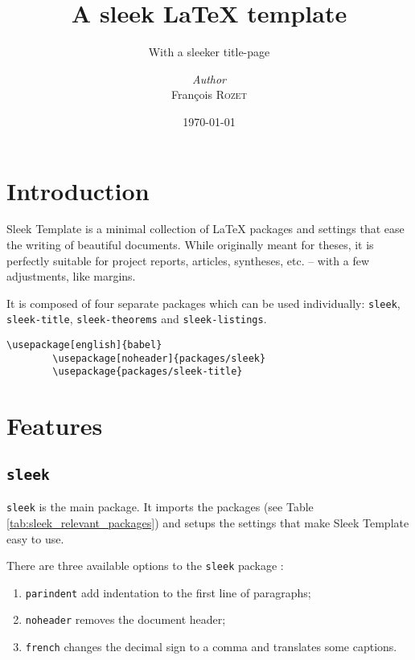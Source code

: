 \documentclass[a4paper, 12pt]{report}
\institute{Random University}
\title{A sleek \LaTeX{} template}
\subtitle{With a sleeker title-page}
\author{\textit{Author}\\François \textsc{Rozet}}
\date{\today}
\begin{document}
    \maketitle
    \romantableofcontents

    \chapter{Introduction}

    Sleek Template is a minimal collection of \LaTeX{} packages and settings that ease the writing of beautiful documents. While originally meant for theses, it is perfectly suitable for project reports, articles, syntheses, etc. -- with a few adjustments, like margins.

    It is composed of four separate packages which can be used individually: \texttt{sleek}, \texttt{sleek-title}, \texttt{sleek-theorems} and \texttt{sleek-listings}.

    \begin{lstlisting}[style=latexFrameTB, caption={Example of Sleek Template packages usage.}, gobble=8]
        \usepackage[english]{babel}
        \usepackage[noheader]{packages/sleek}
        \usepackage{packages/sleek-title}
    \end{lstlisting}


    \chapter{Features}

    \section{\texttt{sleek}}

    \texttt{sleek} is the main package. It imports the packages (see Table \ref{tab:sleek_relevant_packages}) and setups the settings that make Sleek Template easy to use.

    There are three available options to the \texttt{sleek} package :

    \begin{enumerate}[noitemsep]
        \item \texttt{parindent} add indentation to the first line of paragraphs;
        \item \texttt{noheader} removes the document header;
        \item \texttt{french} changes the decimal sign to a comma and translates some captions.
    \end{enumerate}
\end{document}
